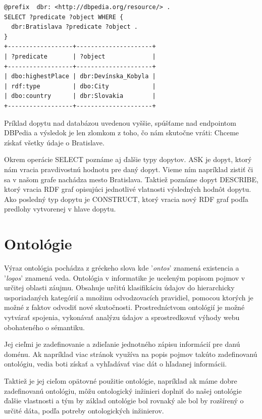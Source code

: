 \documentclass[12pt, a4paper, oneside]{book}
\begin{document}
\begin{verbatim}
@prefix	 dbr: <http://dbpedia.org/resource/> .
SELECT ?predicate ?object WHERE {
  dbr:Bratislava ?predicate ?object .
}
+------------------+---------------------+
| ?predicate       | ?object             | 
+------------------+---------------------+
| dbo:highestPlace | dbr:Devínska_Kobyla | 
| rdf:type         | dbo:City            | 
| dbo:country      | dbr:Slovakia        | 
+------------------+---------------------+
\end{verbatim}


Príklad dopytu nad databázou uvedenou vyššie, spúšťame nad endpointom DBPedia a výsledok je len zlomkom z toho, čo nám skutočne vráti: Chceme získať všetky údaje o Bratislave.


Okrem operácie SELECT poznáme aj ďalšie typy dopytov. ASK je dopyt, ktorý nám vracia pravdivostnú hodnotu pre daný dopyt. Vieme ním napríklad zistiť či sa v našom grafe nachádza mesto Bratislava. Taktiež poznáme dopyt DESCRIBE, ktorý vracia RDF graf opisujúci jednotlivé vlatnosti výsledných hodnôt dopytu. Ako posledný typ dopytu je CONSTRUCT, ktorý vracia nový RDF graf podľa predlohy vytvorenej v hlave dopytu.

\chapter{Ontológie}



Výraz ontológia \cite{ontology} pochádza z gréckeho slova kde '\textit{ontos}' znamená existencia a '\textit{logos}' znamená veda. Ontológia v informatike je uceleným popisom pojmov v určitej oblasti záujmu. Obsahuje určitú klasifikáciu údajov do hierarchicky usporiadaných kategórií a množinu odvodzovacích pravidiel, pomocou ktorých je možné z faktov odvodiť nové skutočnosti. Prostredníctvom ontológií je možné vytvárať spojenia, vykonávať analýzu údajov a sprostredkovať výhody webu obohateného o sémantiku. 


Jej cieľmi je zadefinovanie a zdieľanie jednotného zápisu informácií pre danú doménu. Ak napríklad viac stránok využíva na popis pojmov takúto zadefinovanú ontológiu, vedia boti získať a vyhľadávať viac dát o hľadanej informácii.


Taktiež je jej cieľom opätovné použitie ontológie, napríklad ak máme dobre zadefinovanú ontológiu, môžu ontologický inžinieri doplniť do našej ontológie ďalšie vlastnosti a tým by základ ontológie bol rovnaký ale bol by rozšírený o určité dáta, podľa potreby ontologických inžinierov.
\end{document}
